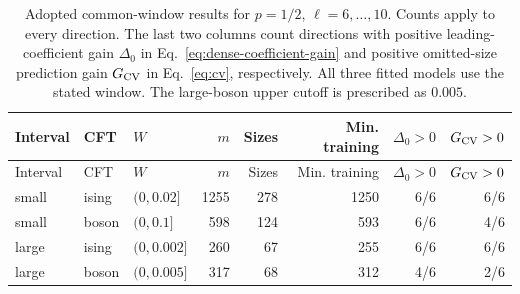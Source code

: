 \begingroup\setlength{\tabcolsep}{3pt}
\begin{longtable}{lllrrrrr}
\caption{Adopted common-window results for $p=1/2$, $\ell=6,\ldots,10$. Counts apply to every direction. The last two columns count directions with positive leading-coefficient gain $\Delta_0$ in Eq.~\eqref{eq:dense-coefficient-gain} and positive omitted-size prediction gain $G_{\rm CV}$ in Eq.~\eqref{eq:cv}, respectively. All three fitted models use the stated window. The large-boson upper cutoff is prescribed as $0.005$.}
\label{tab:common-window-counts}\\\toprule
Interval & CFT & $W$ & $m$ & Sizes & Min. training & $\Delta_0>0$ & $G_{\rm CV}>0$\\\midrule
\endfirsthead
\toprule
Interval & CFT & $W$ & $m$ & Sizes & Min. training & $\Delta_0>0$ & $G_{\rm CV}>0$\\\midrule
\endhead
\bottomrule\endfoot
small & ising & $(0,0.02]$ & 1255 & 278 & 1250 & 6/6 & 6/6\\
small & boson & $(0,0.1]$ & 598 & 124 & 593 & 6/6 & 4/6\\
large & ising & $(0,0.002]$ & 260 & 67 & 255 & 6/6 & 6/6\\
large & boson & $(0,0.005]$ & 317 & 68 & 312 & 4/6 & 2/6\\
\end{longtable}
\endgroup
